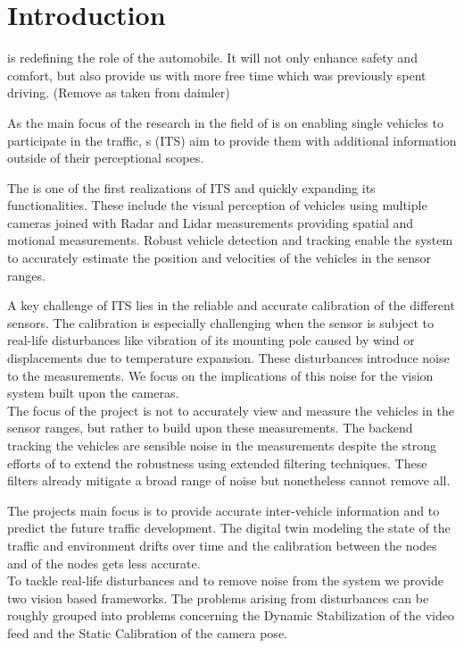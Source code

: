 
\section{Introduction}
\AD{} is redefining the role of the automobile.
It will not only enhance safety and comfort, but also provide us with more free time which was previously spent driving. (Remove as taken from daimler) 

As the main focus of the research in the field of \AD{} is on enabling single vehicles to participate in the traffic,
\ITS{}s (ITS) aim to provide them with additional information outside of their perceptional scopes.

The \Providentia{} is one of the first realizations of ITS and quickly expanding its functionalities. These include the visual perception of vehicles using multiple cameras joined with Radar and Lidar measurements providing spatial and motional measurements.
Robust vehicle detection and tracking enable the system to accurately estimate the position and velocities of the vehicles in the sensor ranges.

A key challenge of ITS lies in the reliable and accurate calibration of the different sensors.
The calibration is especially challenging when the sensor is subject to real-life disturbances like vibration of its mounting pole caused by wind or displacements due to temperature expansion.
These disturbances introduce noise to the measurements. We focus on the implications of this noise for the vision system built upon the cameras.
\\

The focus of the project is not to accurately view and measure the vehicles in the sensor ranges, but rather to build upon these measurements. 
The backend tracking the vehicles are sensible noise in the measurements despite the strong efforts of to extend the robustness using extended filtering techniques. 
These filters already mitigate a broad range of noise but nonetheless cannot remove all.

The projects main focus is to provide accurate inter-vehicle information and to predict the future traffic development.
The digital twin modeling the state of the traffic and environment drifts over time and the calibration between the nodes and of the nodes gets less accurate.
\\

To tackle real-life disturbances and to remove noise from the system we provide two vision based frameworks. 
The problems arising from disturbances can be roughly grouped into problems concerning the Dynamic Stabilization of the video feed and the Static Calibration of the camera pose.

